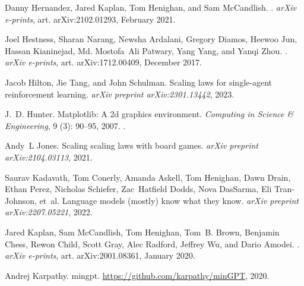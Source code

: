 \documentclass{article} %
\begin{document}
\begin{thebibliography}{67}
Danny {Hernandez}, Jared {Kaplan}, Tom {Henighan}, and Sam {McCandlish}.
.
\newblock \emph{arXiv e-prints}, art. arXiv:2102.01293, February 2021.

Joel {Hestness}, Sharan {Narang}, Newsha {Ardalani}, Gregory {Diamos}, Heewoo
  {Jun}, Hassan {Kianinejad}, Md. Mostofa~Ali {Patwary}, Yang {Yang}, and Yanqi
  {Zhou}.
.
\newblock \emph{arXiv e-prints}, art. arXiv:1712.00409, December 2017.

Jacob Hilton, Jie Tang, and John Schulman.
\newblock Scaling laws for single-agent reinforcement learning.
\newblock \emph{arXiv preprint arXiv:2301.13442}, 2023.

J.~D. Hunter.
\newblock Matplotlib: A 2d graphics environment.
\newblock \emph{Computing in Science \& Engineering}, 9 (3):
  90--95, 2007.
\newblock {}.

Andy~L Jones.
\newblock Scaling scaling laws with board games.
\newblock \emph{arXiv preprint arXiv:2104.03113}, 2021.

Saurav Kadavath, Tom Conerly, Amanda Askell, Tom Henighan, Dawn Drain, Ethan
  Perez, Nicholas Schiefer, Zac~Hatfield Dodds, Nova DasSarma, Eli
  Tran-Johnson, et~al.
\newblock Language models (mostly) know what they know.
\newblock \emph{arXiv preprint arXiv:2207.05221}, 2022.

Jared {Kaplan}, Sam {McCandlish}, Tom {Henighan}, Tom~B. {Brown}, Benjamin
  {Chess}, Rewon {Child}, Scott {Gray}, Alec {Radford}, Jeffrey {Wu}, and Dario
  {Amodei}.
.
\newblock \emph{arXiv e-prints}, art. arXiv:2001.08361, January 2020.

Andrej Karpathy.
\newblock mingpt.
\newblock \url{https://github.com/karpathy/minGPT}, 2020.


\end{thebibliography}
\end{document}
